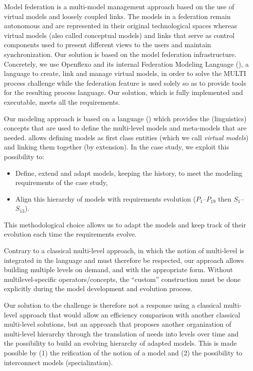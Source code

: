 Model federation is a multi-model management approach based on the use of
virtual models and loosely coupled links. The models in a federation remain
autonomous and are represented in their original technological spaces whereas
virtual models (also called conceptual models) and links that serve as control
components used to present different views to the users and maintain
synchronization. Our solution is based on the model federation infrastructure.
Concretely, we use Openflexo and its internal Federation Modeling Language
(\FML), a language to create, link and manage virtual models, in order to solve
the MULTI process challenge while the federation feature is used solely so as
to provide tools for the resulting process language. Our solution, which is
fully implemented and executable, meets all the requirements.

Our modeling approach is based on a language (\FML) which provides the
(linguistics) concepts that are used to define the multi-level models and
meta-models that are needed. \FML allows defining models as first class
entities (which we call \emph{virtual models}) and linking them together (by
extension). In the \mpc case study, we exploit this possibility to:
\begin{itemize}
    \item Define, extend and adapt models, keeping the history, to meet the %
    modeling requirements of the case study,
    \item Align this hierarchy of models with requirements evolution
      ($P_1$--$P_{19}$ then $S_1$--$S_{13}$).
\end{itemize}
This methodological choice allows us to adapt the models and keep track of their evolution each time the requirements evolve.

Contrary to a classical multi-level approach, in which the notion of
multi-level is integrated in the language and must therefore be respected, our
approach allows building multiple levels on demand, and with the appropriate form.
Without multilevel-specific operators/concepts, the \enquote{custom}
construction must be done explicitly during the model development and evolution
process.

Our solution to the challenge is therefore not a response using a classical multi-level approach that would allow an efficiency comparison with another classical multi-level solutions, but an approach that proposes another organization of multi-level hierarchy through the translation of needs into levels over time and the possibility to build an evolving hierarchy of adapted models. This is made possible by (1) the reification of the notion of a model and (2) the possibility to interconnect models (specialization).%

